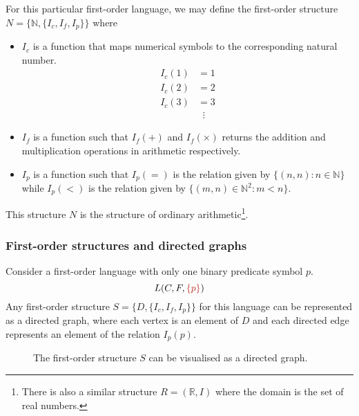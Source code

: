 For this particular first-order language, we may define the first-order structure \(N = \{\mathbb{N}, \{I_c, I_f, I_p\}\}\) where
%
\begin{itemize}
    \item \(I_c\) is a function that maps numerical symbols to the corresponding natural number.
    \begin{align*}
        I_c (1) &= 1\\
        I_c (2) &= 2\\
        I_c (3) &= 3\\
        &\;\;\vdots
    \end{align*}

    \item \(I_f\) is a function such that \(I_f (+)\) and \(I_f (\times)\) returns the addition and multiplication operations in arithmetic respectively.
    
    \item \(I_p\) is a function such that \(I_p (=)\) is the relation given by \(\{(n, n) : n \in \mathbb{N}\}\) while \(I_p (<)\) is the relation given by \(\{(m, n) \in \mathbb{N}^2 : m < n\}\).
\end{itemize}
%
This structure \(N\) is the structure of ordinary arithmetic\footnote{There is also a similar structure \(R = (\mathbb{R}, I)\) where the domain is the set of real numbers.}.



\subsubsection{First-order structures and directed graphs}

Consider a first-order language with only one binary predicate symbol \(p\).
%
\[L(C, F, {\color{BrickRed} \{p\}})\]
%
Any first-order structure \(S = \{D, \{I_c, I_f, I_p\}\}\) for this language can be represented as a directed graph, where each vertex is an element of \(D\) and each directed edge represents an element of the relation \(I_p (p)\).

\begin{figure}[H]
    \centering
    \caption{The first-order structure \(S\) can be visualised as a directed graph.}
    \label{fig:Ch01-first-order-structure-as-directed-graph}
\end{figure}